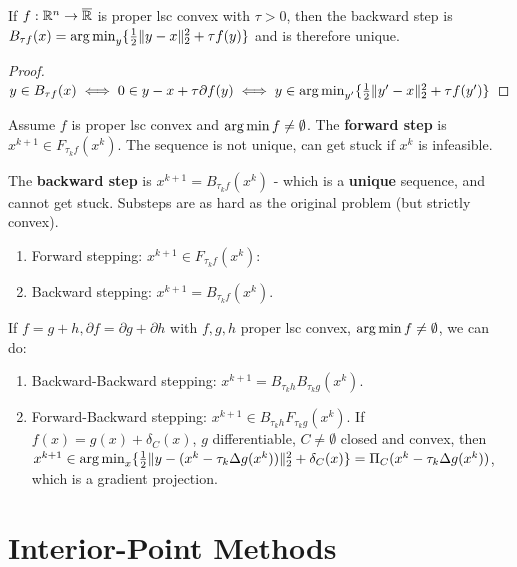 \begin{thm}
  \label{sec:first-order-methods-2}
  If $f: \mathbb{R}^{n} \rightarrow \overline {\mathbb{R}}$ is proper lsc convex with
  $\tau > 0$, then the backward step is $B_{\tau f}(x) = \operatorname*{arg\,min}_{y}
  \{ \frac{1}{2} \| y - x \|_{2}^{2} + \tau f(y) \} $ and is therefore unique.
\end{thm}

\begin{proof}
  $y \in B_{\tau f}(x) \iff 0 \in y - x + \tau \partial f(y) \iff y
  \in \operatorname*{arg\,min}_{y'} \{ \frac{1}{2} \| y' - x \|_{2}^{2} + \tau f(y') \}$
\end{proof}

\begin{thm}
  \label{sec:first-order-methods-3}
  Assume $f$ is proper lsc convex and $\operatorname*{arg\,min} f \neq \emptyset$. The
  \textbf{forward step} is $x^{k+1} \in F_{\tau_{k} f}(x^{k})$. The
  sequence is not unique, can get stuck if $x^{k}$ is infeasible.

  The \textbf{backward step} is $x^{k+1} = B_{\tau_{k} f}(x^{k})$ -
  which is a \textbf{unique} sequence, and cannot get stuck.  Substeps
  are as hard as the original problem (but strictly convex).
\end{thm}

\begin{enumerate}
\item Forward stepping: $x^{k+1} \in F_{\tau_{k} f}(x^{k})$:
\item Backward stepping: $x^{k+1} = B_{\tau_{k} f}(x^{k})$.
\end{enumerate}

If $f = g + h, \partial f = \partial g + \partial h$ with $f, g, h$
proper lsc convex, $\operatorname*{arg\,min} f \neq \emptyset$, we can do:

\begin{enumerate}
\item Backward-Backward stepping: $x^{k+1} = B_{\tau_{k} h}
  B_{\tau_{k} g}(x^{k})$.
\item Forward-Backward stepping: $x^{k+1} \in B_{\tau_{k} h}
  F_{\tau_{k} g}(x^{k})$.  If $f(x) = g(x) + \delta_{C}(x)$, $g$
  differentiable, $C \neq \emptyset$ closed and convex, then $x^{k+1}
  \in \operatorname*{arg\,min}_{x} \{ \frac{1}{2}  \| y - (x^{k} - \tau_{k} \Delta
  g(x^{k})) \|_{2}^{2} + \delta_{C}(x) \} = \operatorname*{\Pi}_{C}(x^{k} - \tau_{k}
  \Delta g(x^{k}))$, which is a gradient projection.
\end{enumerate}

\section{Interior-Point Methods}
\label{sec:inter-point-meth}

